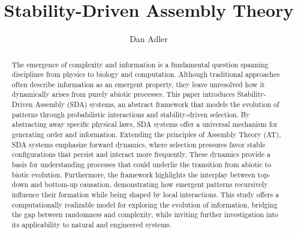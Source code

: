\documentclass[preprint,12pt]{elsarticle}
\begin{document}
\begin{frontmatter}



\title{Stability-Driven Assembly Theory}


\author{Dan Adler} %


\begin{abstract}
The emergence of complexity and information is a fundamental question spanning disciplines from physics to biology and computation. Although traditional approaches often describe information as an emergent property, they leave unresolved how it dynamically arises from purely abiotic processes. This paper introduces Stability-Driven Assembly (SDA) systems, an abstract framework that models the evolution of patterns through probabilistic interactions and stability-driven selection. By abstracting away specific physical laws, SDA systems offer a universal mechanism for generating order and information. Extending the principles of Assembly Theory (AT), SDA systems emphasize forward dynamics, where selection pressures favor stable configurations that persist and interact more frequently. These dynamics provide a basis for understanding processes that could underlie the transition from abiotic to biotic evolution. Furthermore, the framework highlights the interplay between top-down and bottom-up causation, demonstrating how emergent patterns recursively influence their formation while being shaped by local interactions. This study offers a computationally realizable model for exploring the evolution of information, bridging the gap between randomness and complexity, while inviting further investigation into its applicability to natural and engineered systems.
\end{abstract}


\end{frontmatter}
\end{document}
